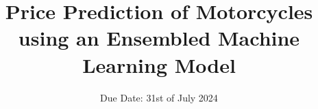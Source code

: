 

\title{\textbf{Price Prediction of Motorcycles using an Ensembled Machine Learning Model}}

\date{%
  Due Date: 31st of July 2024
}
\usepackage[cc]{titlepic}





\DeclareSIUnit\eVperc{\eV\per\clight}
\DeclareSIUnit{}

\maketitle
\thispagestyle{empty}
\tableofcontents
\newpage






\printbibliography{}

\appendix
\newpage



